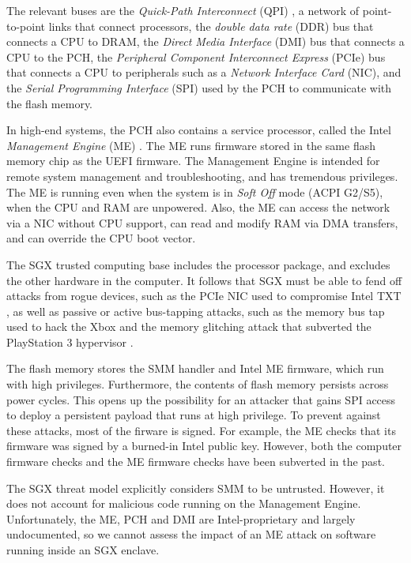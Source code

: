 The relevant buses are the \textit{Quick-Path Interconnect} (QPI)
\cite{intel2009qpi}, a network of point-to-point links that connect processors,
the \textit{double data rate} (DDR) bus that connects a CPU to DRAM, the
\textit {Direct Media Interface} (DMI) bus that connects a CPU to the PCH,
the \textit{Peripheral Component Interconnect Express} (PCIe) bus that connects
a CPU to peripherals such as a \textit{Network Interface Card} (NIC), and the
\textit {Serial Programming Interface} (SPI) used by the PCH to communicate
with the flash memory.

In high-end systems, the PCH also contains a service processor, called the
Intel \textit{Management Engine} (ME) \cite{ruan2014intelme}.  The ME runs
firmware stored in the same flash memory chip as the UEFI firmware. The
Management Engine is intended for remote system management and troubleshooting,
and has tremendous privileges. The ME is running even when the system is in
\textit{Soft Off} mode (ACPI G2/S5), when the CPU and RAM are unpowered. Also,
the ME can access the network via a NIC without CPU support, can read and
modify RAM via DMA transfers, and can override the CPU boot vector.

The SGX trusted computing base includes the processor package, and excludes the
other hardware in the computer. It follows that SGX must be able to fend off
attacks from rogue devices, such as the PCIe NIC used to compromise Intel TXT
\cite{wojtczuk2011txt}, as well as passive or active bus-tapping attacks, such
as the memory bus tap used to hack the Xbox \cite{huang2003xbox} and the
memory glitching attack that subverted the PlayStation 3 hypervisor
\cite{hotz2010ps3}.

The flash memory stores the SMM handler and Intel ME firmware, which run with
high privileges. Furthermore, the contents of flash memory persists across
power cycles. This opens up the possibility for an attacker that gains SPI
access to deploy a persistent payload that runs at high privilege. To prevent
against these attacks, most of the firware is signed. For example, the ME
checks that its firmware was signed by a burned-in Intel public key. However,
both the computer firmware checks \cite{wojtczuk2010bios} and the ME firmware
checks \cite{tereshkin2009amt} have been subverted in the past.

The SGX threat model explicitly considers SMM to be untrusted. However, it does
not account for malicious code running on the Management Engine. Unfortunately,
the ME, PCH and DMI are Intel-proprietary and largely undocumented, so we
cannot assess the impact of an ME attack on software running inside an SGX
enclave.


